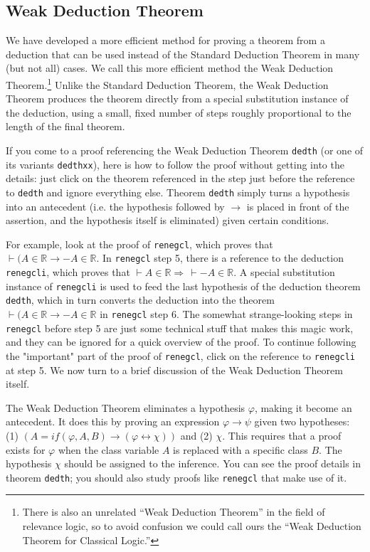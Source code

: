 \subsection{Weak Deduction Theorem}

We have developed
a more efficient method for proving a theorem from a deduction
that can be used instead of the Standard Deduction Theorem
in many (but not all) cases.
We call this more efficient method the
Weak Deduction Theorem.\footnote{
There is also an unrelated ``Weak Deduction Theorem''
in the field of relevance logic, so to avoid confusion we could call
ours the ``Weak Deduction Theorem for Classical Logic.''}
Unlike the Standard Deduction Theorem, the Weak Deduction Theorem produces the
theorem directly from a special substitution instance of the deduction,
using a small, fixed number of steps roughly proportional to the length
of the final theorem.

If you come to a proof referencing the Weak Deduction Theorem
\texttt{dedth} (or one of its variants \texttt{dedthxx}),
here is how to follow the proof without getting into the details:
just click on the theorem referenced in the step
just before the reference to \texttt{dedth} and ignore everything else.
Theorem \texttt{dedth} simply turns a hypothesis into an antecedent
(i.e. the hypothesis followed by $\rightarrow$
is placed in front of the assertion, and the hypothesis
itself is eliminated) given certain conditions.

For example, look at the proof of \texttt{renegcl}, which proves that
$ \vdash ( A \in \mathbb{R} \rightarrow - A \in \mathbb{R} $.
In \texttt{renegcl} step 5,
there is a reference to the deduction \texttt{renegcli}, which proves that
$ \vdash A \in \mathbb{R} \Rightarrow\, \vdash - A \in \mathbb{R}$.
A special substitution instance of \texttt{renegcli} is used
to feed the last hypothesis of the deduction theorem \texttt{dedth}, which in
turn converts the deduction into the theorem
$ \vdash ( A \in \mathbb{R} \rightarrow - A \in \mathbb{R} $
in \texttt{renegcl} step 6.
The somewhat strange-looking steps in \texttt{renegcl} before step 5 are just
some technical stuff that makes this magic work, and they can be ignored
for a quick overview of the proof. To continue following the "important"
part of the proof of \texttt{renegcl},
click on the reference to \texttt{renegcli} at step 5.
We now turn to a brief discussion of the Weak Deduction Theorem itself.

The Weak Deduction Theorem
eliminates a hypothesis $\varphi$, making it become an antecedent.
It does this by proving an expression
$ \varphi \rightarrow \psi $ given two hypotheses:
(1)
$ ( A = if ( \varphi , A , B ) \rightarrow ( \varphi \leftrightarrow \chi ) ) $
and
(2) $\chi$.
This requires that a proof exists for $\varphi$ when the class variable
$A$ is replaced with a specific class $B$. The hypothesis $\chi$
should be assigned to the inference.
You can see the proof details in theorem \texttt{dedth}; you should also
study proofs like \texttt{renegcl} that make use of it.

